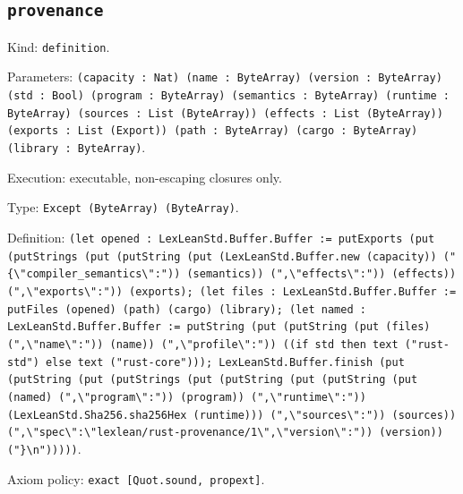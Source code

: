 \documentclass[11pt]{article}
\begin{document}
\subsection*{\texttt{provenance}}
\noindent Kind: \texttt{definition}.\par
\noindent Parameters: \texttt{(capacity : Nat) (name : ByteArray) (version : ByteArray) (std : Bool) (program : ByteArray) (semantics : ByteArray) (runtime : ByteArray) (sources : List (ByteArray)) (effects : List (ByteArray)) (exports : List (Export)) (path : ByteArray) (cargo : ByteArray) (library : ByteArray)}.\par
\noindent Execution: executable, non-escaping closures only.\par
\noindent Type: \texttt{Except (ByteArray) (ByteArray)}.\par
\noindent Definition: \texttt{(let opened : LexLeanStd.Buffer.Buffer := putExports (put (putStrings (put (putString (put (LexLeanStd.Buffer.new (capacity)) ("\{\textbackslash{}"compiler\_semantics\textbackslash{}":")) (semantics)) (",\textbackslash{}"effects\textbackslash{}":")) (effects)) (",\textbackslash{}"exports\textbackslash{}":")) (exports); (let files : LexLeanStd.Buffer.Buffer := putFiles (opened) (path) (cargo) (library); (let named : LexLeanStd.Buffer.Buffer := putString (put (putString (put (files) (",\textbackslash{}"name\textbackslash{}":")) (name)) (",\textbackslash{}"profile\textbackslash{}":")) ((if std then text ("rust-std") else text ("rust-core"))); LexLeanStd.Buffer.finish (put (putString (put (putStrings (put (putString (put (putString (put (named) (",\textbackslash{}"program\textbackslash{}":")) (program)) (",\textbackslash{}"runtime\textbackslash{}":")) (LexLeanStd.Sha256.sha256Hex (runtime))) (",\textbackslash{}"sources\textbackslash{}":")) (sources)) (",\textbackslash{}"spec\textbackslash{}":\textbackslash{}"lexlean/rust-provenance/1\textbackslash{}",\textbackslash{}"version\textbackslash{}":")) (version)) ("\}\textbackslash{}n")))))}.\par
\noindent Axiom policy: \texttt{exact [Quot.sound, propext]}.\par
\end{document}

